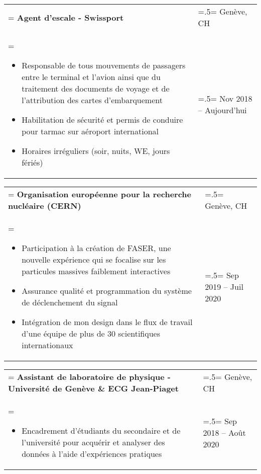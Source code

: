 \documentclass[letterpaper, 11pt]{article}
\begin{document}
\begin{tabularx}{1.0\textwidth} { 
   >{\raggedright\arraybackslash\hsize=1.5\hsize\linewidth=\hsize}X 
   >{\raggedleft\arraybackslash\hsize=.5\hsize\linewidth=\hsize}X }
\normalsize
\bf{Agent d'escale - Swissport} & Genève, CH\\
\normalfont \begin{itemize}[leftmargin=*,noitemsep,topsep=0pt]
\item Responsable de tous mouvements de passagers entre le terminal et l'avion ainsi que du traitement des documents de voyage et de l'attribution des cartes d'embarquement
\item Habilitation de sécurité et permis de conduire pour tarmac sur aéroport international
\item Horaires irréguliers (soir, nuits, WE, jours fériés)
\end{itemize} & Nov 2018 -- Aujourd'hui
\end{tabularx}

\begin{tabularx}{1.0\textwidth} { 
   >{\raggedright\arraybackslash\hsize=1.5\hsize\linewidth=\hsize}X 
   >{\raggedleft\arraybackslash\hsize=.5\hsize\linewidth=\hsize}X }
\normalsize
\bf{Organisation européenne pour la recherche nucléaire (CERN)} & Genève, CH\\
\normalfont \begin{itemize}[leftmargin=*,noitemsep,topsep=0pt]
\item 
Participation à la création de FASER, une nouvelle expérience qui se focalise sur les particules massives faiblement interactives
\item Assurance qualité et programmation du système de déclenchement du signal
\item Intégration de mon design dans le flux de travail d'une équipe de plus de 30 scientifiques internationaux
\end{itemize} & Sep 2019 -- Juil 2020
\end{tabularx}

\begin{tabularx}{1.0\textwidth} { 
   >{\raggedright\arraybackslash\hsize=1.5\hsize\linewidth=\hsize}X 
   >{\raggedleft\arraybackslash\hsize=.5\hsize\linewidth=\hsize}X }
\normalsize
\bf{
Assistant de laboratoire de physique - Université de Genève \& ECG Jean-Piaget} & Genève, CH\\
\normalfont \begin{itemize}[leftmargin=*,noitemsep,topsep=0pt]
\item Encadrement d'étudiants du secondaire et de l'université pour acquérir et analyser des données à l'aide d'expériences pratiques
\end{itemize} & Sep 2018 -- Août 2020
\end{tabularx}
\end{document}

